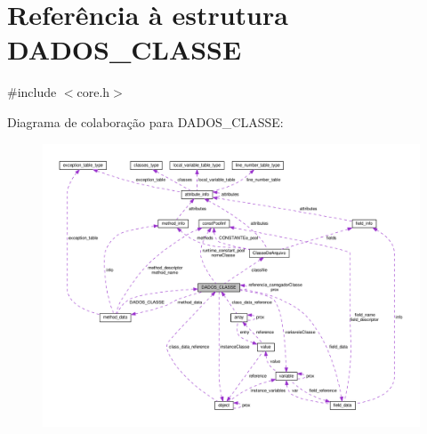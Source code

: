 \hypertarget{struct_d_a_d_o_s___c_l_a_s_s_e}{\section{Referência à estrutura D\-A\-D\-O\-S\-\_\-\-C\-L\-A\-S\-S\-E}
\label{struct_d_a_d_o_s___c_l_a_s_s_e}
}


{\ttfamily \#include $<$core.\-h$>$}



Diagrama de colaboração para D\-A\-D\-O\-S\-\_\-\-C\-L\-A\-S\-S\-E\-:\nopagebreak
\begin{figure}[H]
\begin{center}
\leavevmode
\includegraphics[width=350pt]{struct_d_a_d_o_s___c_l_a_s_s_e__coll__graph}
\end{center}
\end{figure}
